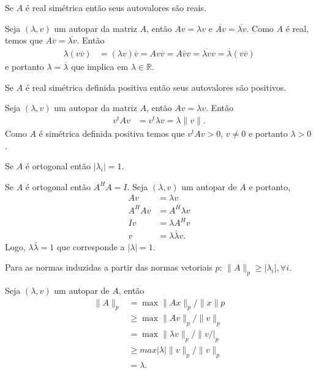 \documentclass[a4paper,12pt, leqno, answers]{exam}
\begin{document}
\begin{questions}
    \question Se $A$ \'{e} real sim\'{e}trica ent\~{a}o seus autovalores s\~{a}o reais.
    \begin{solution}
        Seja $(\lambda, v)$ um autopar da matriz $A$, ent\~{a}o $A v = \lambda v$ e $\overline{A v} = \overline{\lambda v}$. Como $A$ \'{e} real, temos que $A \overline{v} = \overline{\lambda v}$. Ent\~{a}o
        \begin{align*}
            \lambda (v \overline{v}) &= (\lambda v) \overline{v} = A v \overline{v} = A \overline{v} v = \overline{\lambda v} v = \overline{\lambda} (v \overline{v})
        \end{align*}
        e portanto $\lambda = \overline{\lambda}$ que implica em $\lambda \in \mathbb{R}$.
    \end{solution}

    \question Se $A$ \'{e} real sim\'{e}trica definida positiva ent\~{a}o seus autovalores s\~{a}o positivos.
    \begin{solution}
        Seja $(\lambda, v)$ um autopar da matriz $A$, ent\~{a}o $A v = \lambda v$. Ent\~{a}o
        \begin{align*}
            v^t A v &= v^t \lambda v = \lambda \| v \|.
        \end{align*}
        Como $A$ \'{e} sim\'{e}trica definida positiva temos que $v^t A v > 0$, $v \neq 0$ e portanto $\lambda > 0$.
    \end{solution}

    \question Se $A$ \'{e} ortogonal ent\~{a}o $| \lambda_i | = 1$.
    \begin{solution}
        Se $A$ \'{e} ortogonal ent\~{a}o $A^H A = I$. Seja $(\lambda, v)$ um autopar de $A$ e portanto,
        \begin{align*}
            A v &= \lambda v \\
            A^H A v &= A^H \lambda v \\
            I v &= \lambda A^H v \\
            v &= \lambda \bar{\lambda} v.
        \end{align*}
        Logo, $\lambda \bar{\lambda} = 1$ que corresponde a $|\lambda| = 1$.
    \end{solution}

    \question Para as normas induzidas a partir das normas vetoriais $p$: $\| A \|_p \geq | \lambda_i |, \forall i$.
    \begin{solution}
        Seja $(\lambda, v)$ um autopar de $A$, ent\~{a}o
        \begin{align*}
            \| A \|_p &= \max \| A x \|_p / \| x \| p \\
            &\geq \max \| A v \|_p / \| v \|_p \\
            &= \max \| \lambda v \|_p / \| v /|_p \\
            &\geq max | \lambda | \| v \|_p / \| v \|_p \\
            &= \lambda.
        \end{align*}
    \end{solution}


\end{questions}
\end{document}
